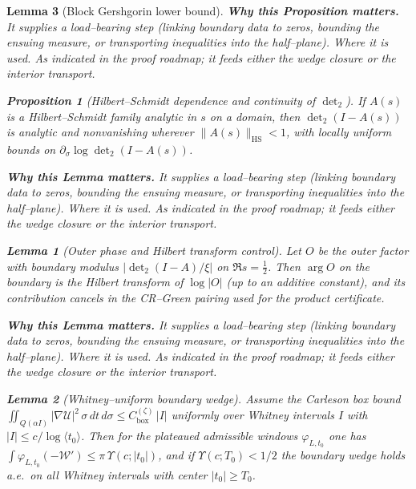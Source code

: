 \documentclass[11pt]{article}
\newtheorem{proposition}{Proposition}[section]
\newtheorem{lemma}{Lemma}[section]
\theoremstyle{definition}
\theoremstyle{remark}
\providecommand{\Cbox}{C^{(\zeta)}_{\mathrm{box}}}
\begin{document}
\begin{lemma}[Block Gershgorin lower bound]
\noindent\textbf{Why this Proposition matters.} It supplies a load--bearing step (linking boundary data to zeros, bounding the ensuing measure, or transporting inequalities into the half--plane).
\noindent\textit{Where it is used.} As indicated in the proof roadmap; it feeds either the wedge closure or the interior transport.
\begin{proposition}[Hilbert--Schmidt dependence and continuity of $\det_2$]\label{prop:hs-det2-continuity}
If $A(s)$ is a Hilbert--Schmidt family analytic in $s$ on a domain, then $\det\nolimits_2(I-A(s))$ is analytic and nonvanishing wherever $\|A(s)\|_{\mathrm{HS}}<1$, with locally uniform bounds on $\partial_\sigma \log\det\nolimits_2(I-A(s))$.
\end{proposition}

\noindent\textbf{Why this Lemma matters.} It supplies a load--bearing step (linking boundary data to zeros, bounding the ensuing measure, or transporting inequalities into the half--plane).
\noindent\textit{Where it is used.} As indicated in the proof roadmap; it feeds either the wedge closure or the interior transport.
\begin{lemma}[Outer phase and Hilbert transform control]\label{lem:outer-phase-HT}
Let $O$ be the outer factor with boundary modulus $|\det\nolimits_2(I-A)/\xi|$ on $\Re s=\tfrac12$. Then $\arg O$ on the boundary is the Hilbert transform of $\log|O|$ (up to an additive constant), and its contribution cancels in the CR--Green pairing used for the product certificate.
\end{lemma}

\noindent\textbf{Why this Lemma matters.} It supplies a load--bearing step (linking boundary data to zeros, bounding the ensuing measure, or transporting inequalities into the half--plane).
\noindent\textit{Where it is used.} As indicated in the proof roadmap; it feeds either the wedge closure or the interior transport.
\begin{lemma}[Whitney--uniform boundary wedge]\label{lem:whitney-uniform-wedge}
Assume the Carleson box bound $\iint_{Q(\alpha I)} |\nabla \mathcal U|^2\,\sigma\,dt\,d\sigma \le \Cbox\,|I|$ uniformly over Whitney intervals $I$ with $|I|\le c/\log\langle t_0\rangle$.
Then for the plateaued admissible windows $\varphi_{L,t_0}$ one has $\int \varphi_{L,t_0}(-\mathcal W')\le \pi\,\Upsilon(c;|t_0|)$, and if $\Upsilon(c;T_0)<1/2$ the boundary wedge holds a.e.\ on all Whitney intervals with center $|t_0|\ge T_0$.
\end{lemma}


\end{lemma}
\end{document}
